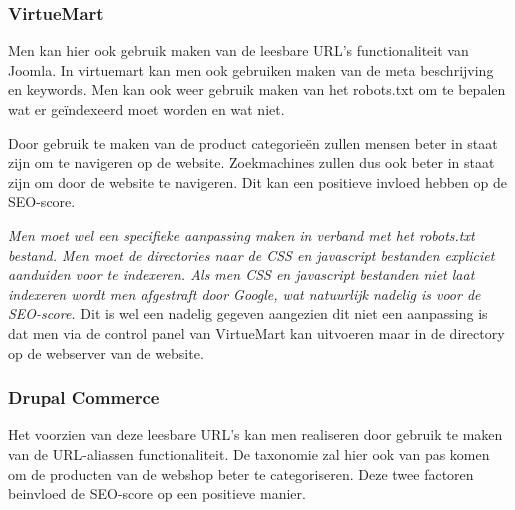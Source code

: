 \subsubsection{VirtueMart}
Men kan hier ook gebruik maken van de leesbare URL's functionaliteit van Joomla. In virtuemart kan men ook gebruiken maken van de meta beschrijving en keywords. Men kan ook weer gebruik maken van het robots.txt om te bepalen wat er geïndexeerd moet worden en wat niet.

Door gebruik te maken van de product categorieën zullen mensen beter in staat zijn om te navigeren op de website. Zoekmachines zullen dus ook beter in staat zijn om door de website te navigeren. Dit kan een positieve invloed hebben op de SEO-score.

\textit{Men moet wel een specifieke aanpassing maken in verband met het robots.txt bestand. Men moet de directories naar de CSS en javascript bestanden expliciet aanduiden voor te indexeren. Als men CSS en javascript bestanden niet laat indexeren wordt men afgestraft door Google, wat natuurlijk nadelig is voor de SEO-score.} \autocite{Isaksen2019} Dit is wel een nadelig gegeven aangezien dit niet een aanpassing is dat men via de control panel van VirtueMart kan uitvoeren maar in de directory op de webserver van de website.

\subsubsection{Drupal Commerce}
Het voorzien van deze leesbare URL's kan men realiseren door gebruik te maken van de URL-aliassen functionaliteit. De taxonomie zal hier ook van pas komen om de producten van de webshop beter te categoriseren. Deze twee factoren beinvloed de SEO-score op een positieve manier.
